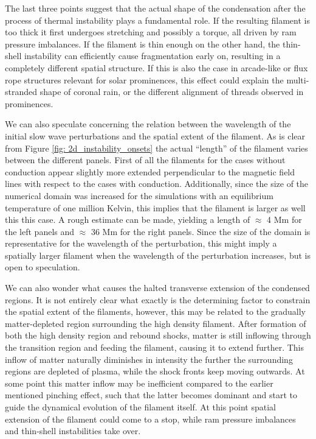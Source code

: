 The last three points suggest that the actual shape of the condensation after the process of thermal instability plays a fundamental role. If the resulting filament is too thick it first undergoes stretching and possibly a torque, all driven by ram pressure imbalances. If the filament is thin enough on the other hand, the thin-shell instability can efficiently cause fragmentation early on, resulting in a completely different spatial structure. If this is also the case in arcade-like or flux rope structures relevant for solar prominences, this effect could explain the multi-stranded shape of coronal rain, or the different alignment of threads observed in prominences.

We can also speculate concerning the relation between the wavelength of the initial slow wave perturbations and the spatial extent of the filament. As is clear from Figure \ref{fig: 2d_instability_onsets} the actual ``length'' of the filament varies between the different panels. First of all the filaments for the cases without conduction appear slightly more extended perpendicular to the magnetic field lines with respect to the cases with conduction. Additionally, since the size of the numerical domain was increased for the simulations with an equilibrium temperature of one million Kelvin, this implies that the filament is larger as well this this case. A rough estimate can be made, yielding a length of $\approx$ 4 Mm for the left panels and $\approx$ 36 Mm for the right panels. Since the size of the domain is representative for the wavelength of the perturbation, this might imply a spatially larger filament when the wavelength of the perturbation increases, but is open to speculation.

We can also wonder what causes the halted transverse extension of the condensed regions. It is not entirely clear what exactly is the determining factor to constrain the spatial extent of the filaments, however, this may be related to the gradually matter-depleted region surrounding the high density filament. After formation of both the high density region and rebound shocks, matter is still inflowing through the transition region and feeding the filament, causing it to extend further. This inflow of matter naturally diminishes in intensity the further the surrounding regions are depleted of plasma, while the shock fronts keep moving outwards. At some point this matter inflow may be inefficient compared to the earlier mentioned pinching effect, such that the latter becomes dominant and start to guide the dynamical evolution of the filament itself. At this point spatial extension of the filament could come to a stop, while ram pressure imbalances and thin-shell instabilities take over.

